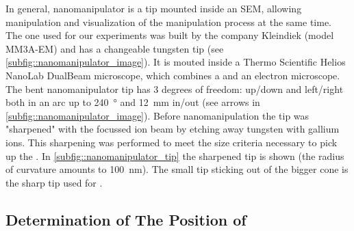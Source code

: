 	In general, nanomanipulator is a tip mounted inside an SEM, allowing manipulation and visualization of the manipulation process at the same time.
	The one used for our experiments was built by the company Kleindiek (model MM3A-EM) and has a changeable tungsten tip (see \cref{subfig::nanomanipulator_image}).
	It is mouted inside a Thermo Scientific\texttrademark{} Helios NanoLab\texttrademark{}  DualBeam\texttrademark{} microscope, which combines a \fib and an electron microscope.
	The bent nanomanipulator tip has 3 degrees of freedom: up/down and left/right both in an arc up to \SI{240}{\degree} and \SI{12}{\milli\metre} in/out (see arrows in \cref{subfig::nanomanipulator_image}). 
	Before nanomanipulation the tip was "sharpened" with the focussed ion beam by etching away  tungsten with gallium ions.
	This sharpening was performed to meet the size criteria necessary to pick up the \nds.
	In \cref{subfig::nanomanipulator_tip} the sharpened tip is shown (the radius of curvature amounts to \SI{100}{\nano\meter}).
	The small tip sticking out of the bigger cone is the sharp tip used for \pp.


	\subsection{Determination of The Position of \Nds} \label{subsec::position}

